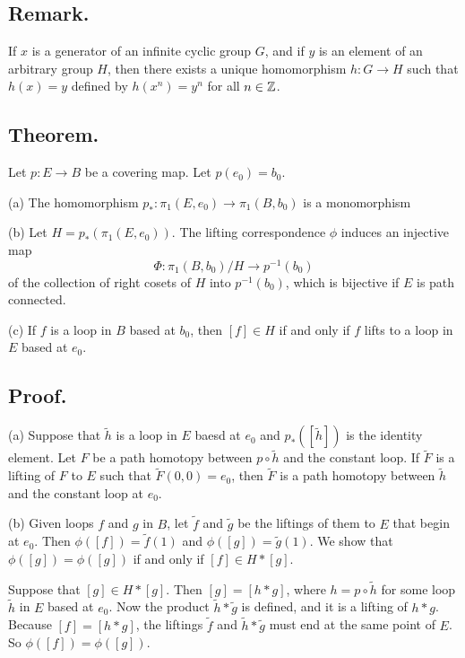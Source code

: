 \documentclass[titlepage]{article}
\begin{document}
\subsection{Remark.} If $x$ is a generator of an infinite cyclic group $G$, and if $y$ is an element of an arbitrary group $H$, then there exists a unique homomorphism $h: G \to H$ such that $h(x) = y$ defined by $h(x^{n}) = y^{n}$ for all $n \in \mathbb{Z}$.

\subsection{Theorem.} Let $p: E \to B$ be a covering map. Let $p(e_{0}) = b_{0}$.

(a) The homomorphism $p_{*}: \pi_{1}(E, e_{0}) \to \pi_{1}(B, b_{0})$ is a monomorphism

(b) Let $H = p_{*}(\pi_{1}(E, e_{0}))$. The lifting correspondence $\phi$ induces an injective map 
$$\Phi: \pi_{1}(B, b_{0}) / H \to p^{-1}(b_{0})$$
of the collection of right cosets of $H$ into $p^{-1}(b_{0})$, which is bijective if $E$ is path connected.

(c) If $f$ is a loop in $B$ based at $b_{0}$, then $[f] \in H$ if and only if $f$ lifts to a loop in $E$ based at $e_{0}$.

\subsection{Proof.}

(a) Suppose that $\tilde{h}$ is a loop in $E$ baesd at $e_{0}$ and $p_{*}([\tilde{h}])$ is the identity element. Let $F$ be a path homotopy between $p \circ \tilde{h}$ and the constant loop. If $\tilde{F}$ is a lifting of $F$ to $E$ such that $\tilde{F}(0, 0) = e_{0}$, then $\tilde{F}$ is a path homotopy between $\tilde{h}$ and the constant loop at $e_{0}$.

(b) Given loops $f$ and $g$ in $B$, let $\tilde{f}$ and $\tilde{g}$ be the liftings of them to $E$ that begin at $e_{0}$. Then $\phi([f]) = \tilde{f}(1)$ and $\phi([g]) = \tilde{g}(1)$. We show that $\phi([g]) = \phi([g])$ if and only if $[f] \in H * [g]$.

Suppose that $[g] \in H * [g]$. Then $[g] = [h * g]$, where $h = p \circ \tilde{h}$ for some loop $\tilde{h}$ in $E$ based at $e_{0}$. Now the product $\tilde{h} * \tilde{g}$ is defined, and it is a lifting of $h * g$. Because $[f] = [h * g]$, the liftings $\tilde{f}$ and $\tilde{h} * \tilde{g}$ must end at the same point of $E$. So $\phi([f]) = \phi([g])$.
\end{document}
